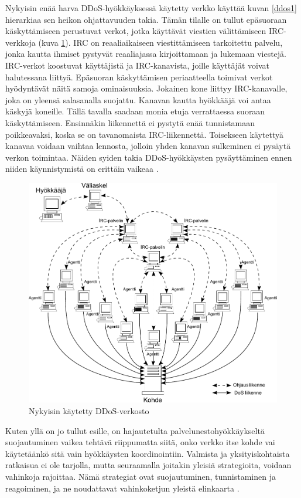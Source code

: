 Nykyisin enää harva DDoS-hyökkäyksessä käytetty verkko käyttää kuvan
\ref{ddos1} hierarkiaa sen heikon ohjattavuuden takia. Tämän tilalle
on tullut epäsuoraan käskyttämiseen perustuvat verkot, jotka käyttävät
viestien välittämiseen IRC-verkkoja (kuva \ref{ddos2}). IRC on
reaaliaikaiseen viestittämiseen tarkoitettu palvelu, jonka kautta
ihmiset pystyvät reaaliajassa kirjoittamaan ja lukemaan
viestejä. IRC-verkot koostuvat käyttäjistä ja IRC-kanavista, joille
käyttäjät voivat halutessana liittyä. Epäsuoran käskyttämisen
periaatteella toimivat verkot hyödyntävät näitä samoja
ominaisuuksia. Jokainen kone liittyy IRC-kanavalle, joka on yleensä
salasanalla suojattu. Kanavan kautta hyökkääjä voi antaa käskyjä
koneille. Tällä tavalla saadaan monia etuja verrattaessa suoraan
käskyttämiseen.  Ensinnäkin liikennettä ei pystytä enää tunnistamaan
poikkeavaksi, koska se on tavanomaista IRC-liikennettä. Toisekseen
käytettyä kanavaa voidaan vaihtaa lennosta, jolloin yhden kanavan
sulkeminen ei pysäytä verkon toimintaa. Näiden syiden takia
DDoS-hyökkäysten pysäyttäminen ennen niiden käynnistymistä on erittäin
vaikeaa \cite{DDOS}.

\begin{figure}[t]
\centering
\includegraphics[width=12cm]{pics/ddos_uusi.pdf}
\caption{Nykyisin käytetty DDoS-verkosto}
\label{ddos2}
\end{figure}


Kuten yllä on jo tullut esille, on hajautetulta palvelunestohyökkäykseltä
suojautuminen vaikea tehtävä riippumatta siitä, onko verkko itse kohde vai
käytetäänkö sitä vain hyökkäysten koordinointiin. Valmista ja yksityiskohtaista
ratkaisua ei ole tarjolla, mutta seuraamalla joitakin yleisiä strategioita,
voidaan vahinkoja rajoittaa. Nämä strategiat ovat suojautuminen, tunnistaminen
ja reagoiminen, ja ne noudattavat vahinkoketjun yleistä elinkaarta \cite{DDOS}.

